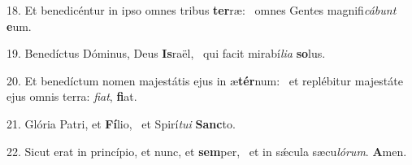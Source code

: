 18. Et benedicéntur in ipso omnes tribus \textbf{ter}ræ: \ast\  omnes Gentes magnifi\textit{cá}\textit{bunt} \textbf{e}um.\

19. Benedíctus Dóminus, Deus \textbf{Is}raël, \ast\  qui facit mirabí\textit{li}\textit{a} \textbf{so}lus.\

20. Et benedíctum nomen majestátis ejus in æ\textbf{tér}num: \ast\  et replébitur majestáte ejus omnis terra: \textit{fi}\textit{at}, \textbf{fi}at.\

21. Glória Patri, et \textbf{Fí}lio, \ast\  et Spirí\textit{tu}\textit{i} \textbf{Sanc}to.\

22. Sicut erat in princípio, et nunc, et \textbf{sem}per, \ast\  et in sǽcula sæcu\textit{ló}\textit{rum}. \textbf{A}men.\

